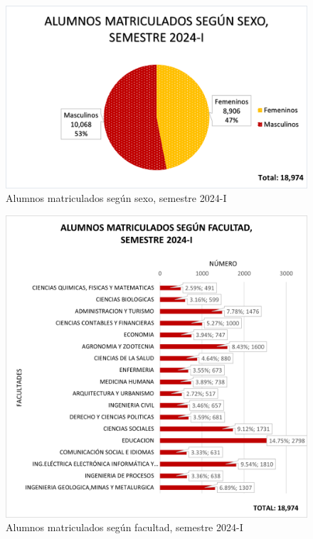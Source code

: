 \documentclass[
  12pt,
  letterpaper,
]{scrreprt}
\begin{document}
\begin{figure}[H]

\caption{Alumnos matriculados según sexo, semestre 2024-I}

{\centering \includegraphics[width=0.7\linewidth,height=\textheight,keepaspectratio]{imagen/imagen3.png}

}

\end{figure}%
\begin{figure}[H]

\caption{Alumnos matriculados según facultad, semestre 2024-I}

{\centering \includegraphics[width=0.6\linewidth,height=\textheight,keepaspectratio]{imagen/imagen5.png}

}

\end{figure}%
\end{document}
